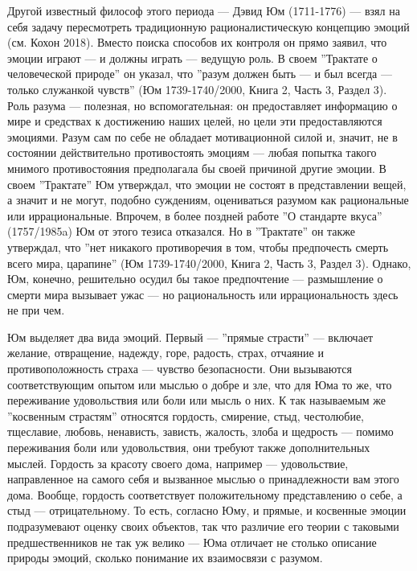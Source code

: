 \documentclass[11pt]{book}
\begin{document}
Другой известный философ этого периода --- Дэвид Юм (1711-1776) --- взял на себя задачу пересмотреть традиционную рационалистическую концепцию эмоций (см. Кохон 2018). Вместо поиска способов их контроля он прямо заявил, что эмоции играют --- и должны играть --- ведущую роль. В своем ''Трактате о человеческой природе'' он указал, что ''разум должен быть --- и был всегда --- только служанкой чувств'' (Юм 1739-1740/2000, Книга 2, Часть 3, Раздел 3). Роль разума --- полезная, но вспомогательная: он предоставляет информацию о мире и средствах к достижению наших целей, но цели эти предоставляются эмоциями. Разум сам по себе не обладает мотивационной силой и, значит, не в состоянии действительно противостоять эмоциям --- любая попытка такого мнимого противостояния предполагала бы своей причиной другие эмоции. В своем ''Трактате'' Юм утверждал, что эмоции не состоят в представлении вещей, а значит и не могут, подобно суждениям, оцениваться разумом как рациональные или иррациональные. Впрочем, в более поздней работе ''О стандарте вкуса'' (1757/1985a) Юм от этого тезиса отказался. Но в ''Трактате'' он также утверждал, что ''нет никакого противоречия в том, чтобы предпочесть смерть всего мира, царапине'' (Юм 1739-1740/2000, Книга 2, Часть 3, Раздел 3). Однако, Юм, конечно, решительно осудил бы такое предпочтение --- размышление о смерти мира вызывает ужас --- но рациональность или иррациональность здесь не при чем.

Юм выделяет два вида эмоций. Первый --- ''прямые страсти'' --- включает желание, отвращение, надежду, горе, радость, страх, отчаяние и противоположность страха --- чувство безопасности. Они вызываются соответствующим опытом или мыслью о добре и зле, что для Юма то же, что переживание удовольствия или боли или мысль о них. К так называемым же ''косвенным страстям'' относятся гордость, смирение, стыд, честолюбие, тщеславие, любовь, ненависть, зависть, жалость, злоба и щедрость --- помимо переживания боли или удовольствия, они требуют также дополнительных мыслей. Гордость за красоту своего дома, например --- удовольствие, направленное на самого себя и вызванное мыслью о принадлежности вам этого дома. Вообще, гордость соответствует положительному представлению о себе, а стыд --- отрицательному. То есть, согласно Юму, и прямые, и косвенные эмоции подразумевают оценку своих объектов, так что различие его теории с таковыми предшественников не так уж велико --- Юма отличает не столько описание природы эмоций, сколько понимание их взаимосвязи с разумом.
\end{document}
